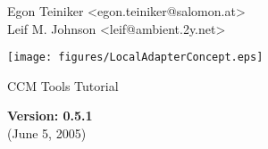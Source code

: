 \begin{titlepage}

\centering

\vspace*{20mm}
{\Large
Egon Teiniker <egon.teiniker@salomon.at>\\
Leif M. Johnson <leif@ambient.2y.net> \\
}

\vspace{30 mm}

\centerline{\texttt{[image: figures/LocalAdapterConcept.eps]}}

\vspace{30mm}

{\Huge CCM Tools Tutorial}\\ 

\vspace{30mm}

{\Large
\bf
Version: 0.5.1
}\\
(June 5, 2005)
\end{titlepage}